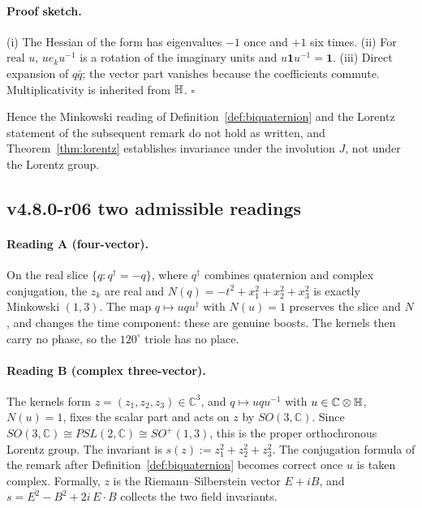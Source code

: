 \paragraph{Proof sketch.}
(i) The Hessian of the form has eigenvalues \(-1\) once and \(+1\) six times.  (ii) For real
\(u\), \(u e_k u^{-1}\) is a rotation of the imaginary units and \(u\mathbf 1u^{-1}=\mathbf 1\).
(iii) Direct expansion of \(q\bar q\); the vector part vanishes because the coefficients commute.
Multiplicativity is inherited from \(\mathbb{H}\).  \(\square\)

Hence the Minkowski reading of Definition~\ref{def:biquaternion} and the Lorentz statement of the
subsequent remark do not hold as written, and Theorem~\ref{thm:lorentz} establishes invariance
under the involution \(J\), not under the Lorentz group.

\subsection*{v4.8.0-r06 two admissible readings}
\label{subsec:v480-r06-readings}

\paragraph{Reading A (four-vector).}
On the real slice \(\{q:q^\dagger=-q\}\), where \(q^\dagger\) combines quaternion and complex
conjugation, the \(z_k\) are real and \(N(q)=-t^2+x_1^2+x_2^2+x_3^2\) is exactly Minkowski
\((1,3)\).  The map \(q\mapsto uqu^\dagger\) with \(N(u)=1\) preserves the slice and \(N\), and
changes the time component: these are genuine boosts.  The kernels then carry no phase, so the
\(120^\circ\) triole has no place.

\paragraph{Reading B (complex three-vector).}
The kernels form \(z=(z_1,z_2,z_3)\in\mathbb C^3\), and \(q\mapsto uqu^{-1}\) with
\(u\in\mathbb C\otimes\mathbb{H}\), \(N(u)=1\), fixes the scalar part and acts on \(z\) by
\(SO(3,\mathbb C)\).  Since \(SO(3,\mathbb C)\cong PSL(2,\mathbb C)\cong SO^+(1,3)\), this is the
proper orthochronous Lorentz group.  The invariant is \(s(z):=z_1^2+z_2^2+z_3^2\).  The conjugation
formula of the remark after Definition~\ref{def:biquaternion} becomes correct once \(u\) is taken
complex.  Formally, \(z\) is the Riemann--Silberstein vector \(E+iB\), and
\(s=E^2-B^2+2i\,E\cdot B\) collects the two field invariants.

